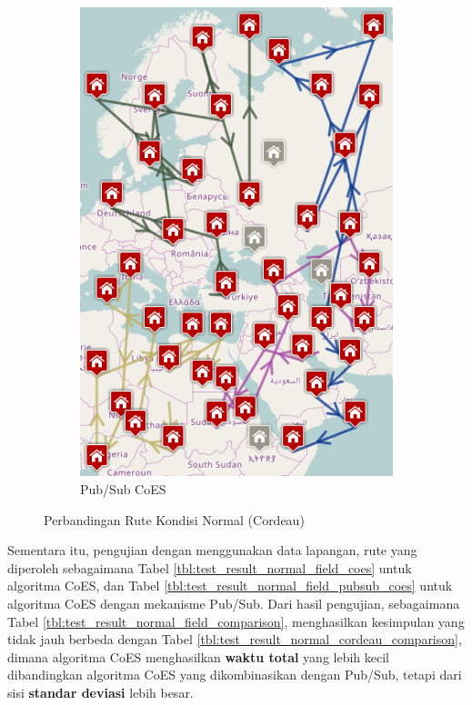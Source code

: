 \begin{figure}[!]
\begin{subfigure}[t]{0.5\textwidth}
		\includegraphics[width=\textwidth]{../../Resources/Images/test_result_normal_cordeau_pubsub_coes}
		\caption{Pub/Sub CoES}
		\label{fig:test_result_normal_cordeau_pubsub_coes}
    \end{subfigure}
    \caption{Perbandingan Rute Kondisi Normal (Cordeau)}
    \label{fig:test_result_normal_cordeau_comparison}
\end{figure}


Sementara itu, pengujian dengan menggunakan data lapangan, rute yang diperoleh sebagaimana Tabel \ref{tbl:test_result_normal_field_coes} untuk algoritma CoES, dan Tabel \ref{tbl:test_result_normal_field_pubsub_coes} untuk algoritma CoES dengan mekanisme Pub/Sub. Dari hasil pengujian, sebagaimana Tabel \ref{tbl:test_result_normal_field_comparison}, menghasilkan kesimpulan yang tidak jauh berbeda dengan Tabel \ref{tbl:test_result_normal_cordeau_comparison}, dimana algoritma CoES menghasilkan \textbf{waktu total} yang lebih kecil dibandingkan algoritma CoES yang dikombinasikan dengan Pub/Sub, tetapi dari sisi \textbf{standar deviasi} lebih besar.


